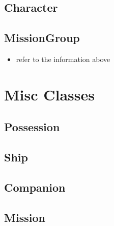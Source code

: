 \documentclass[12pt,letterpaper]{scrreprt}
\begin{document}
	\section{Character}
	\section{MissionGroup}
		\begin{itemize}
 			\item refer to the information above
 		\end{itemize}
\chapter{Misc Classes}
	\section{Possession}
	\section{Ship}
	\section{Companion}
	\section{Mission}
\end{document}
